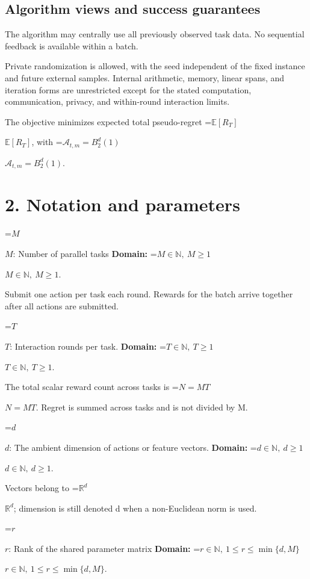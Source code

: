 \documentclass[10pt,a4paper]{article}
\newcommand{\AtlasMath}[1]{\par\begingroup\centering\setbox0=\hbox{$\displaystyle #1$}\ifdim\wd0>1.4\linewidth\typeout{ATLAS WIDE FORMULA: \the\wd0}\fi\ifdim\wd0>\linewidth\resizebox{\linewidth}{!}{\box0}\else\box0\fi\par\endgroup}
\newcommand{\AtlasInlineMath}[1]{\begingroup\setbox0=\hbox{$#1$}\ifdim\wd0>.4\linewidth\endgroup\AtlasMath{#1}\else\endgroup$#1$\fi}
\begin{document}
\subsection{Algorithm views and success guarantees}


The algorithm may centrally use all previously observed task data. No sequential feedback is available within a batch.



Private randomization is allowed, with the seed independent of the fixed instance and future external samples. Internal arithmetic, memory, linear spans, and iteration forms are unrestricted except for the stated computation, communication, privacy, and within-round interaction limits.



The objective minimizes expected total pseudo-regret \AtlasInlineMath{\mathbb{E}[R_T]}, with \AtlasInlineMath{\mathcal{A}_{t,m}=B_2^d(1)}.



\section{2. Notation and parameters}


\AtlasInlineMath{M}: Number of parallel tasks \textbf{Domain:} \AtlasInlineMath{M\in\mathbb N,\ M\ge1}.



Submit one action per task each round. Rewards for the batch arrive together after all actions are submitted.



\AtlasInlineMath{T}: Interaction rounds per task. \textbf{Domain:} \AtlasInlineMath{T\in\mathbb N,\ T\ge1}.



The total scalar reward count across tasks is \AtlasInlineMath{N=MT}. Regret is summed across tasks and is not divided by M.



\AtlasInlineMath{d}: The ambient dimension of actions or feature vectors. \textbf{Domain:} \AtlasInlineMath{d\in\mathbb N,\ d\ge1}.



Vectors belong to \AtlasInlineMath{\mathbb R^d}; dimension is still denoted d when a non-Euclidean norm is used.



\AtlasInlineMath{r}: Rank of the shared parameter matrix \textbf{Domain:} \AtlasInlineMath{r\in\mathbb N,\ 1\le r\le\min\{d,M\}}.
\end{document}
